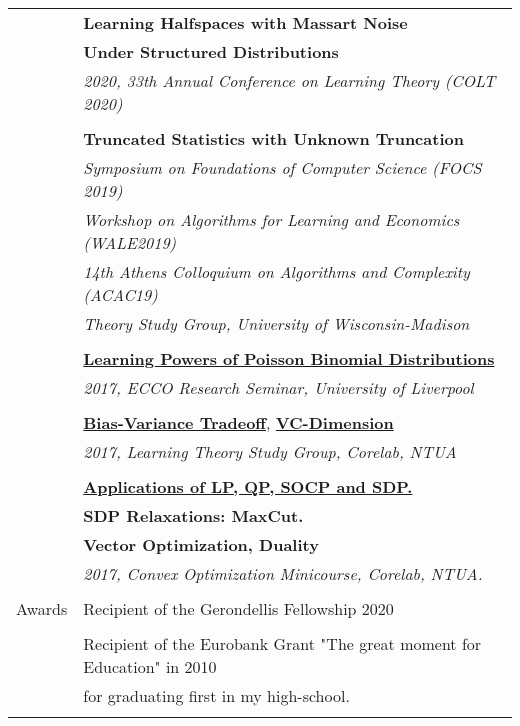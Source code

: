 \documentclass[letterpaper,11pt,oneside]{article}
\begin{document}
\begin{longtable}{@{} l l}
     &\textbf{Learning Halfspaces with Massart Noise}\\
     &\textbf{Under Structured Distributions}\\
     & \emph{2020, 33th Annual Conference on Learning Theory (COLT 2020) } \\
     & \\

 &\textbf{Truncated Statistics with Unknown Truncation}\\
 &\emph{Symposium on Foundations of Computer Science (FOCS 2019)}\\
 &\emph{Workshop on Algorithms for Learning and Economics (WALE2019)}\\
 &\emph{14th Athens Colloquium on Algorithms and Complexity (ACAC19)}\\
 &\emph{Theory Study Group, University of Wisconsin-Madison}\\
 &\\

 &\href{https://vkonton.github.io/assets/talks/pbdPowers.pdf}
 {\textbf{Learning Powers of Poisson Binomial Distributions}}\\
 &\emph{2017, ECCO Research Seminar, University of Liverpool} \\
&\\

  &\href{https://vkonton.github.io/assets/talks/learning1.pdf}{\textbf{Bias-Variance Tradeoff}},
  \href{https://vkonton.github.io/assets/talks/learning2.pdf}{\textbf{VC-Dimension}}\\
  &\emph{2017, Learning Theory Study Group, Corelab, NTUA}\\
  &\\

  &\href{https://vkonton.github.io/talks/}{\textbf{Applications of LP, QP, SOCP and SDP.}}\\
  &\textbf{SDP Relaxations: MaxCut.}\\
  &\textbf{Vector Optimization, Duality} \\
  &\emph{2017, Convex Optimization Minicourse, Corelab, NTUA.}\\
  &\\



 \Large{Awards}

 & Recipient of the Gerondellis Fellowship 2020 \\
 & \\
 & Recipient of the Eurobank Grant "The great moment for Education" in 2010\\
 & for graduating first in my high-school. \\
 &\\


\end{longtable}
\end{document}
